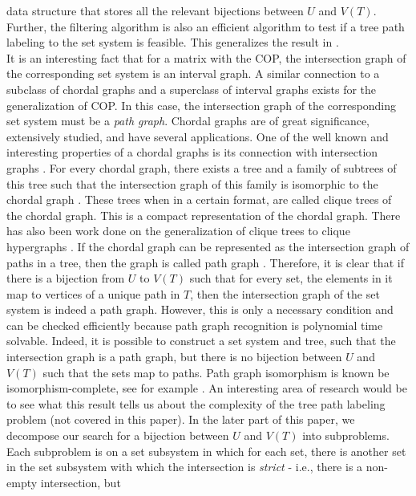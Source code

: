 \documentclass{fsttcs}
\begin{document}
data structure that stores all the relevant bijections between $U$ and
$V(T)$.  
Further, the filtering algorithm is also an efficient algorithm to test if a
tree path labeling to the set system is feasible.  This 
generalizes the result in \cite{nsnrs09}.\\
\noindent
It is an interesting fact that for a matrix with the COP, the
intersection graph of the corresponding set system is an interval
graph.  A similar connection to a subclass of chordal graphs and a
superclass of interval graphs exists for the generalization of COP.
In this case, the intersection graph of the corresponding set system
must be a {\em path graph}. Chordal graphs are of great significance,
extensively studied, and have several applications.  One of the well
known and interesting properties of a chordal graphs is its connection
with intersection graphs \cite{mcg04}. For every chordal graph, there
exists a tree and a family of subtrees of this tree such that the
intersection graph of this family is isomorphic to the chordal graph
\cite{plr70,gav78,bp93}.  These trees when in a certain format, are
called clique trees \cite{apy92} of the chordal graph. This is a
compact representation of the chordal graph. There has also been work
done on the generalization of clique trees to clique hypergraphs
\cite{km02}.  If the chordal graph can be represented as the
intersection graph of paths in a tree, then the graph is called path
graph \cite{mcg04}.  Therefore, it is clear that if there is a
bijection from $U$ to $V(T)$ such that for every set, the elements in
it map to vertices of a unique path in $T$, then the intersection
graph of the set system is indeed a path graph.  However, this is only
a necessary condition and can be checked efficiently because path
graph recognition is polynomial time
solvable\cite{gav78,aas93}. Indeed, it is possible to construct a set
system and tree, such that the intersection graph is a path graph, but
there is no bijection between $U$ and $V(T)$ such that the sets map to
paths. Path graph isomorphism is known be isomorphism-complete, see
for example \cite{kklv10}. An interesting area of research would be to see
what this result tells us about the complexity of the tree path
labeling problem (not covered in this paper). In the later part of
this paper, we decompose our search for a bijection between $U$ and
$V(T)$ into subproblems.  Each subproblem is on a set subsystem in which
for each set, there is another set in the set subsystem with which the
intersection is {\em strict} - i.e., there is a non-empty intersection, but
\end{document}
